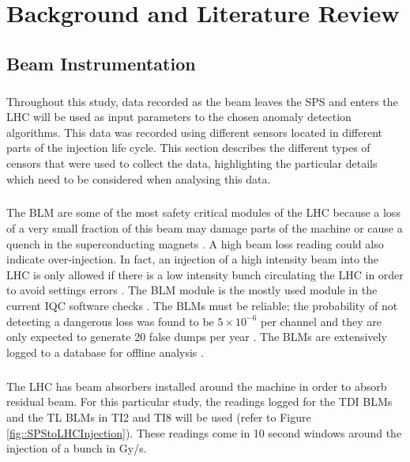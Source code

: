 \chapter{Background and Literature Review}


\section{Beam Instrumentation}
\label{sec::beam_instrumentation}
\paragraph{ }Throughout this study, data recorded as the beam leaves the \acs{SPS} and enters the \acs{LHC} will be used as input parameters to the chosen anomaly detection algorithms. This data was recorded using different sensors located in different parts of the injection life cycle. This section describes the different types of censors that were used to collect the data, highlighting the particular details which need to be considered when analysing this data.

\paragraph{ }The \ac{BLM} are some of the most safety critical modules of the \acs{LHC} because a loss of a very small fraction of this beam may damage parts of the machine or cause a quench in the superconducting magnets \cite{Holzer2006}. A high beam loss reading could also indicate over-injection. In fact, an injection of a high intensity beam into the LHC is only allowed if there is a low intensity bunch circulating the LHC in order to avoid settings errors \cite{Kain2010}. The \acs{BLM} module is the mostly used module in the current IQC software checks \cite{Drosdal2011}. The \acs{BLM}s must be reliable; the probability of not detecting a dangerous loss was found to be $5\times10^{-6}$ per channel and they are only expected to generate 20 false dumps per year \cite{Holzer2006}. The \acs{BLM}s are extensively logged to a database for offline analysis \cite{Holzer2006}. 

\paragraph{ }The \acs{LHC} has beam absorbers installed around the machine in order to absorb residual beam. For this particular study, the readings logged for the \ac{TDI} \acs{BLM}s and the \ac{TL} \acs{BLM}s in TI2 and TI8 will be used (refer to Figure \ref{fig::SPStoLHCInjection}). These readings come in 10 second windows around the injection of a bunch in \ac{Gy/s}.

